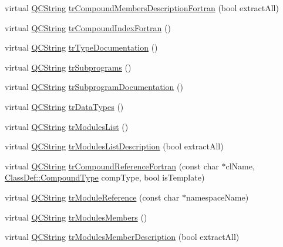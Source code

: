 \begin{DoxyCompactItemize}
virtual \mbox{\hyperlink{class_q_c_string}{Q\+C\+String}} \mbox{\hyperlink{class_translator_italian_a539ce79f5dcf69caa854b7425a2146e0}{tr\+Compound\+Members\+Description\+Fortran}} (bool extract\+All)
\item 
virtual \mbox{\hyperlink{class_q_c_string}{Q\+C\+String}} \mbox{\hyperlink{class_translator_italian_a07e7bc2eeca3c972c0b39ec248adf59c}{tr\+Compound\+Index\+Fortran}} ()
\item 
virtual \mbox{\hyperlink{class_q_c_string}{Q\+C\+String}} \mbox{\hyperlink{class_translator_italian_a0a2e11ea861fed4174f8a9095cf3d763}{tr\+Type\+Documentation}} ()
\item 
virtual \mbox{\hyperlink{class_q_c_string}{Q\+C\+String}} \mbox{\hyperlink{class_translator_italian_a209a6eba3a7a896e7848fea453ec84a8}{tr\+Subprograms}} ()
\item 
virtual \mbox{\hyperlink{class_q_c_string}{Q\+C\+String}} \mbox{\hyperlink{class_translator_italian_a86f2b4671d62eb9dd5f1ab918bffb08c}{tr\+Subprogram\+Documentation}} ()
\item 
virtual \mbox{\hyperlink{class_q_c_string}{Q\+C\+String}} \mbox{\hyperlink{class_translator_italian_a5b18929b238f5ef28d7e1f246ad02297}{tr\+Data\+Types}} ()
\item 
virtual \mbox{\hyperlink{class_q_c_string}{Q\+C\+String}} \mbox{\hyperlink{class_translator_italian_af971eb2ab94039f51ec210ae60c1f408}{tr\+Modules\+List}} ()
\item 
virtual \mbox{\hyperlink{class_q_c_string}{Q\+C\+String}} \mbox{\hyperlink{class_translator_italian_a4cc931c4b131d90a2fe43aabb8ac0ea7}{tr\+Modules\+List\+Description}} (bool extract\+All)
\item 
virtual \mbox{\hyperlink{class_q_c_string}{Q\+C\+String}} \mbox{\hyperlink{class_translator_italian_a19e0fc5292ace562b8cd564cde606d61}{tr\+Compound\+Reference\+Fortran}} (const char $\ast$cl\+Name, \mbox{\hyperlink{class_class_def_ae70cf86d35fe954a94c566fbcfc87939}{Class\+Def\+::\+Compound\+Type}} comp\+Type, bool is\+Template)
\item 
virtual \mbox{\hyperlink{class_q_c_string}{Q\+C\+String}} \mbox{\hyperlink{class_translator_italian_a9de630219d2bc82a336a09e6a9bcf055}{tr\+Module\+Reference}} (const char $\ast$namespace\+Name)
\item 
virtual \mbox{\hyperlink{class_q_c_string}{Q\+C\+String}} \mbox{\hyperlink{class_translator_italian_abf2144ec748424bda890c86cde46bdea}{tr\+Modules\+Members}} ()
\item 
virtual \mbox{\hyperlink{class_q_c_string}{Q\+C\+String}} \mbox{\hyperlink{class_translator_italian_abb595f14406f9fa945e02ddd5ed94c53}{tr\+Modules\+Member\+Description}} (bool extract\+All)

\end{DoxyCompactItemize}
